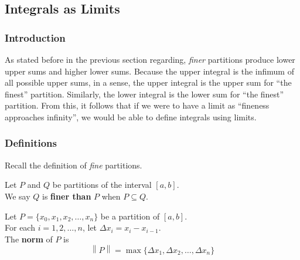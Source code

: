 \documentclass[10pt]{article}
\newenvironment{definition}[1][]{\begin{tcolorbox}[colframe=_orange,colback=_orange2,title=Definition. \ifthenelse{\isempty{#1}}{}{(#1)}
]}{\end{tcolorbox}}
\newcommand\norm[1]{\left\lVert#1\right\rVert}
\begin{document}
\subsection{Integrals as Limits}
\subsubsection{Introduction}
As stated before in the previous section regarding, \textit{finer} partitions produce lower upper sums and higher lower sums. Because the upper integral is the infimum of all possible upper sums, in a sense, the upper integral is the upper sum for ``the finest'' partition. Similarly, the lower integral is the lower sum for ``the finest'' partition. From this, it follows that if we were to have a limit as ``fineness approaches infinity'', we would be able to define integrals using limits.
\subsubsection{Definitions}
Recall the definition of \textit{fine} partitions.
\begin{definition}[Fine Partitions]
    Let $P$ and $Q$ be partitions of the interval $[a,b]$. \\
    We say $Q$ is \textbf{finer than} $P$ when $P\subseteq Q$.
\end{definition}
\begin{definition}[Norm of a Partition]
    Let $P=\{x_0,x_1,x_2,\dots,x_n\}$ be a partition of $[a,b]$. \\
    For each $i=1,2,\dots, n$, let $\Delta x_i=x_i-x_{i-1}$. \\
    The \textbf{norm} of $P$ is
    $$
        \norm{P}=\max\{\Delta x_1,\Delta x_2,\dots,\Delta x_n\}
    $$
\end{definition}
\end{document}
